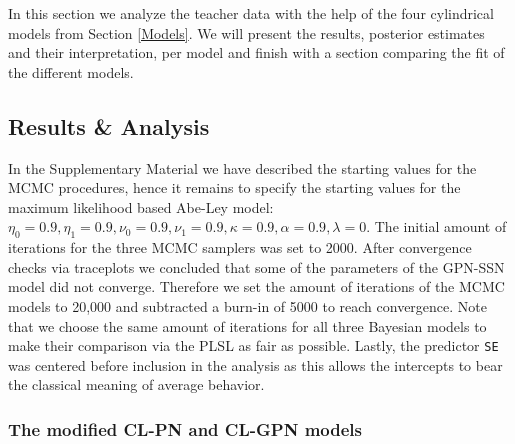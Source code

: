\documentclass[12pt,]{article}
\begin{document}
In this section we analyze the teacher data with the help of the four
cylindrical models from Section \ref{Models}. We will present the
results, posterior estimates and their interpretation, per model and
finish with a section comparing the fit of the different models.

\subsection{Results \& Analysis}\label{DataResults}

In the Supplementary Material we have described the starting values for
the MCMC procedures, hence it remains to specify the starting values for
the maximum likelihood based Abe-Ley model:
\(\eta_0 = 0.9, \eta_1 = 0.9, \nu_0 = 0.9, \nu_1 = 0.9, \kappa = 0.9, \alpha = 0.9, \lambda = 0\).
The initial amount of iterations for the three MCMC samplers was set to
2000. After convergence checks via traceplots we concluded that some of
the parameters of the GPN-SSN model did not converge. Therefore we set
the amount of iterations of the MCMC models to 20,000 and subtracted a
burn-in of 5000 to reach convergence. Note that we choose the same
amount of iterations for all three Bayesian models to make their
comparison via the PLSL as fair as possible. Lastly, the predictor
\verb|SE| was centered before inclusion in the analysis as this allows
the intercepts to bear the classical meaning of average behavior.

\subsubsection{The modified CL-PN and CL-GPN models} \label{resCL(G)PN}
\end{document}

